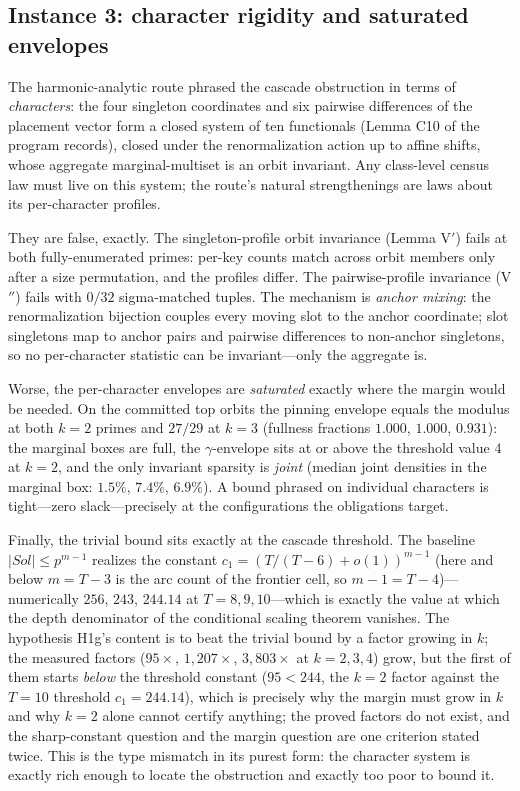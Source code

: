 \documentclass[11pt,a4paper]{article}
\numberwithin{equation}{section}
\theoremstyle{plain}
\theoremstyle{definition}
\theoremstyle{remark}
\begin{document}
\subsection{Instance 3: character rigidity and saturated envelopes}
\label{sec:tm-char}

The harmonic-analytic route phrased the cascade obstruction in terms of
\emph{characters}: the four singleton coordinates and six pairwise
differences of the placement vector form a closed system of ten
functionals (Lemma C10 of the program records), closed under the
renormalization action up to affine shifts, whose aggregate
marginal-multiset is an orbit invariant. Any class-level census law must
live on this system; the route's natural strengthenings are laws about
its per-character profiles.

They are false, exactly. The singleton-profile orbit invariance (Lemma
V$'$) fails at both fully-enumerated primes: per-key counts match across
orbit members only after a size permutation, and the profiles differ. The
pairwise-profile invariance (V$''$) fails with $0/32$ sigma-matched
tuples. The mechanism is \emph{anchor mixing}: the renormalization
bijection couples every moving slot to the anchor coordinate; slot
singletons map to anchor pairs and pairwise differences to non-anchor
singletons, so no per-character statistic can be invariant---only the
aggregate is.

Worse, the per-character envelopes are \emph{saturated} exactly where the
margin would be needed. On the committed top orbits the pinning envelope
equals the modulus at both $k=2$ primes and $27/29$ at $k=3$ (fullness
fractions $1.000$, $1.000$, $0.931$): the marginal boxes are full, the
$\gamma$-envelope sits at or above the threshold value $4$ at $k=2$, and
the only invariant sparsity is \emph{joint} (median joint densities in
the marginal box: $1.5\%$, $7.4\%$, $6.9\%$). A bound phrased on
individual characters is tight---zero slack---precisely at the
configurations the obligations target.

Finally, the trivial bound sits exactly at the cascade threshold. The
baseline $|Sol|\le p^{m-1}$ realizes the constant
$c_1=(T/(T-6)+o(1))^{m-1}$ (here and below $m=T-3$ is the arc count of
the frontier cell, so $m-1=T-4$)---numerically $256$, $243$, $244.14$ at
$T=8,9,10$---which is exactly the value at which the depth denominator
of the conditional scaling theorem vanishes. The hypothesis H1g's
content is to beat the trivial bound by a factor growing in $k$; the
measured factors ($95\times$, $1{,}207\times$, $3{,}803\times$ at
$k=2,3,4$) grow, but the first of them starts \emph{below} the
threshold constant ($95<244$, the $k=2$ factor against the $T=10$
threshold $c_1=244.14$), which is precisely why the margin must
grow in $k$ and why $k=2$ alone cannot certify anything; the proved
factors do not exist, and the sharp-constant question and the margin
question are one criterion stated twice. This is the type mismatch in its purest
form: the character system is exactly rich enough to locate the
obstruction and exactly too poor to bound it.
\end{document}
